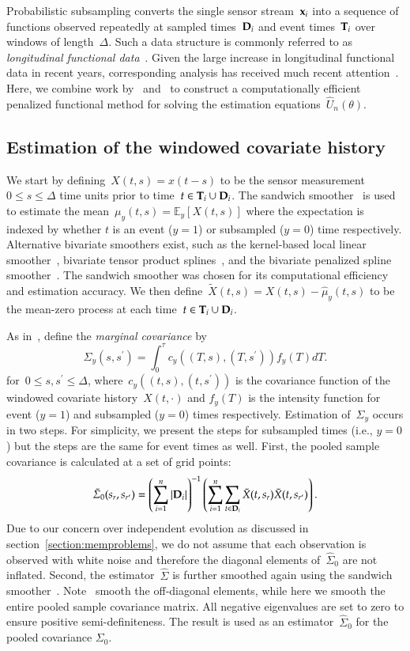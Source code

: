 \documentclass[12pt]{amsart}
\def\E{\mathcal{E}}
\def\E{\mathbb{E}}
\def\bfx{{\bf x}}
\def\bfT{{\bf T}}
\def\bfD{{\bf D}}
\begin{document}
Probabilistic subsampling converts the single sensor stream~$\bfx_i$ into a sequence of functions observed repeatedly at sampled times~$\bfD_i$ and event times~$\bfT_i$ over windows of length~$\Delta$. Such a data structure is commonly referred to as \emph{longitudinal functional data}~\citep{Xiao2013,Goldsmith2015}. Given the large increase in longitudinal functional data in recent years, corresponding analysis has received much recent attention~\citep{Morris2003, MorrisCarroll2006, Baladandayuthapani2008, Di2009, Greven2010, Staicu2010, ChenMuller2012, LiGuan2014}. Here, we combine work by~\cite{Park2018} and~\cite{Goldsmith2011} to construct a computationally efficient penalized functional method for solving the estimation equations~$\hat U_n (\theta)$.

\subsection{Estimation of the windowed covariate history}
\label{sec:margcov}
We start by defining~$X(t,s) = x(t-s)$ to be the sensor measurement~$0 \leq s \leq \Delta$ time units prior to time~$t \in \bfT_i \cup \bfD_i$. The sandwich smoother~\citep{Xiao2013} is used to estimate the mean~$\mu_y(t,s) = \E_y [ X(t,s)]$ where the expectation is indexed by whether $t$ is an event ($y=1$) or subsampled ($y=0$) time respectively. Alternative bivariate smoothers exist, such as the kernel-based local linear smoother~\citep{Hastie2009}, bivariate tensor product splines~\citep{Wood2006}, and the bivariate penalized spline smoother~\citep{MarxEilers2005}. The sandwich smoother was chosen for its computational efficiency and estimation accuracy. We then define~$\tilde X(t,s) = X(t,s) - \hat \mu_y(t,s)$ to be the mean-zero process at each time~$t \in \bfT_i \cup \bfD_i$.

As in~\cite{Park2018}, define the \emph{marginal covariance} by
\[
\Sigma_y (s, s^\prime) = \int_{0}^\tau c_y( (T,s), (T,s^\prime) ) f_y(T) dT.
\]
for~$0 \leq s,s^\prime \leq \Delta$, where~$c_y((t,s), (t,s^\prime))$ is the covariance function of the windowed covariate history~$X(t,\cdot)$ and $f_y(T)$ is the intensity function for event ($y=1$) and subsampled ($y=0$) times respectively. Estimation of~$\Sigma_y$ occurs in two steps. For simplicity, we present the steps for subsampled times (i.e., $y=0$) but the steps are the same for event times as well. First, the pooled sample covariance is calculated at a set of grid points:
\[
\tilde \Sigma_0 (s_r , s_{r^\prime}) = \left( \sum_{i=1}^n \left | \bfD_i \right |\right)^{-1} \left( \sum_{i=1}^n \sum_{t \in \bfD_i} \tilde X (t,s_r) \tilde X (t,s_{r^\prime}) \right).
\]
Due to our concern over independent evolution as discussed in section~\ref{section:memproblems}, we do not assume that each observation is observed with white noise and therefore the diagonal elements of~$\hat \Sigma_0$ are not inflated. Second, the estimator~$\hat \Sigma$ is further smoothed again using the sandwich smoother~\citep{Xiao2013}. Note~\cite{Park2018} smooth the off-diagonal elements, while here we smooth the entire pooled sample covariance matrix. All negative eigenvalues are set to zero to ensure positive semi-definiteness. The result is used as an estimator~$\hat \Sigma_0$ for the pooled covariance $\Sigma_0$.
\end{document}
